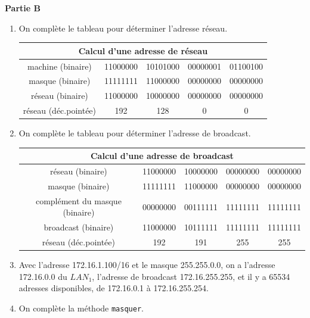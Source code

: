 \documentclass[11pt,a4paper]{article}
\newcommand{\mip}[1]{\texttt{#1}}
\begin{document}
\bigskip

\textbf{Partie B}



\begin{enumerate}[resume]
\item On complète le tableau pour déterminer l'adresse réseau.

\begin{center}
\begin{tabular}{|c|c|c|c|c|}
\hline
\multicolumn{5}{|c|}{Calcul d'une adresse de réseau}\\
\hline
machine (binaire)&11000000&10101000&00000001&01100100\\
\hline 
masque (binaire)&11111111&11000000&00000000&00000000\\
\hline
réseau (binaire)&11000000&10000000&00000000&00000000\\
\hline
réseau (déc.pointée)&192&128&0&0\\
\hline
\end{tabular}
\end{center}

\item On complète le tableau pour déterminer l'adresse de broadcast.

\begin{center}
\begin{tabular}{|c|c|c|c|c|}
\hline
\multicolumn{5}{|c|}{Calcul d'une adresse de broadcast}\\
\hline
réseau (binaire)&11000000&10000000&00000000&00000000\\
\hline 
masque (binaire)&11111111&11000000&00000000&00000000\\
\hline
complément du masque (binaire)&00000000&00111111&11111111&11111111\\
\hline
broadcast (binaire) & 11000000&10111111&11111111&11111111\\
\hline
réseau (déc.pointée)&192&191&255&255\\
\hline
\end{tabular}
\end{center}

\item Avec l'adresse 172.16.1.100/16 et le masque 255.255.0.0, on a l'adresse 172.16.0.0 du $LAN_1$, l'adresse de broadcast 172.16.255.255, et il y a 65534 adresses disponibles, de 172.16.0.1 à 172.16.255.254.

\item On complète la méthode \mip{masquer}.




\end{enumerate}
\end{document}

